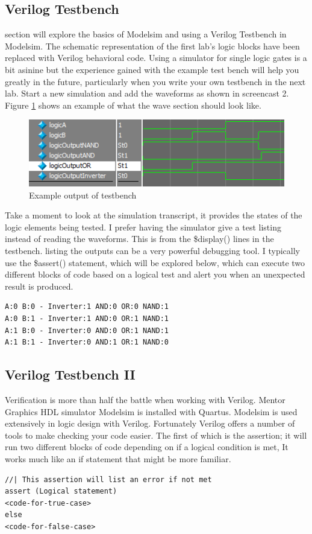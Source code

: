 \subsection{Verilog Testbench}
   section will explore the basics of Modelsim and using a Verilog Testbench in Modelsim. The schematic representation of the first lab's logic blocks have been replaced with Verilog behavioral code. Using a simulator for single logic gates is a bit asinine but the experience gained with the example test bench will help you greatly in the future, particularly when you write your own testbench in the next lab. Start a new simulation and add the waveforms as shown in screencast 2. Figure \ref{LogicOut} shows an example of what the wave section should look like. 
  \begin{figure}[H]
    \label{LogicOut}
    \includegraphics[width=.48\textwidth]{Images/LogicOutput.png}
    \caption{Example output of testbench}
  \end{figure}

  Take a moment to look at the simulation transcript, it provides the states of the logic elements being tested.
  I prefer having the simulator give a test listing instead of reading the waveforms. This is from the \$display()
  lines in the testbench. listing the outputs can be a very powerful debugging tool. I typically use the \$assert()
  statement, which will be explored below, which can execute two different blocks of code based on a logical test and alert you when an unexpected result is produced.
  \begin{lstlisting}
A:0 B:0 - Inverter:1 AND:0 OR:0 NAND:1
A:0 B:1 - Inverter:1 AND:0 OR:1 NAND:1
A:1 B:0 - Inverter:0 AND:0 OR:1 NAND:1
A:1 B:1 - Inverter:0 AND:1 OR:1 NAND:0
  \end{lstlisting}

\subsection{Verilog Testbench II}
  Verification is more than half the battle when working with Verilog. Mentor Graphics HDL simulator Modelsim is installed with Quartus. Modelsim is used extensively in logic design with Verilog. Fortunately Verilog offers a number of tools to make checking your code easier. The first of which is the assertion; it will run two different blocks of code depending on if a logical condition is met, It works much like an if statement that might be more familiar.
  \begin{lstlisting}[caption={Template for System Verilog assertion}]
//| This assertion will list an error if not met
assert (Logical statement)
<code-for-true-case>
else
<code-for-false-case>
  \end{lstlisting}

